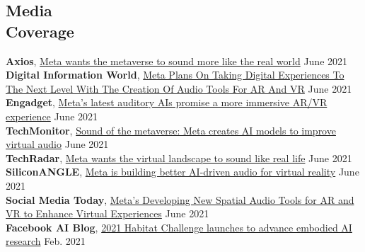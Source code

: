 \documentclass[margin, 10pt]{res} %
\begin{document}
\begin{resume}
\section{Media \\ Coverage}
\textbf{Axios},
\href{https://www.axios.com/2022/06/24/meta-wants-the-metaverse-to-sound-more-like-the-real-world?utm_source=twitter&utm_medium=social&utm_campaign=editorial&utm_content=technology-metaverse}{Meta wants the metaverse to sound more like the real world} \hfill June 2021\\
\textbf{Digital Information World},
\href{https://www.digitalinformationworld.com/2022/06/meta-plans-on-taking-digital.html}{Meta Plans On Taking Digital Experiences To The Next Level With The Creation Of Audio Tools For AR And VR} \hfill June 2021\\
\textbf{Engadget},
\href{https://www.engadget.com/metas-latest-auditory-ai-promise-a-more-immersive-ar-vr-experience-130029625.html?guccounter=1&guce_referrer=aHR0cHM6Ly9sLndvcmtwbGFjZS5jb20v&guce_referrer_sig=AQAAAAwu3kFYVTr7weTarFhe5AHNg9vLok3QfxATQBYtXFYSsZmQkgXIB2s8PHHuclDkYp8w7DA0_oFtTEerWPcxx21S4zDM3ow_vYDF-aClHJaSnf_wJ8nkfGvlsuNKvqo1Y9r1L3Dv0xwUXaTr8BObcNwzx7h9bjLVV6LdZbw2sxr-}{Meta's latest auditory AIs promise a more immersive AR/VR experience} \hfill June 2021\\
\textbf{TechMonitor}, \href{https://techmonitor.ai/technology/emerging-technology/meta-audio-ai-metaverse}{Sound of the metaverse: Meta creates AI models to improve virtual audio} \hfill June 2021\\
\textbf{TechRadar}, \href{https://www.techradar.com/news/meta-wants-the-virtual-landscape-to-sound-like-real-life}{Meta wants the virtual landscape to sound like real life} \hfill June 2021\\
\textbf{SiliconANGLE}, \href{https://siliconangle.com/2022/06/24/meta-building-better-ai-driven-audio-virtual-reality/}{Meta is building better AI-driven audio for virtual reality} \hfill June 2021\\
\textbf{Social Media Today}, \href{https://www.socialmediatoday.com/news/metas-developing-new-spatial-audio-tools-for-ar-and-vr-to-enhance-virtual/626071/?utm_source=dlvr.it&utm_medium=twitter}{Meta’s Developing New Spatial Audio Tools for AR and VR to Enhance Virtual Experiences} \hfill June 2021\\
\textbf{Facebook AI Blog}, \href{https://ai.facebook.com/blog/2021-habitat-challenge-launches-to-advance-embodied-ai-research/}{2021 Habitat Challenge launches to advance embodied AI research} \hfill Feb. 2021\\

\end{resume}
\end{document}
